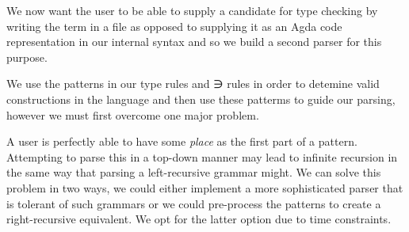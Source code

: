{\begin{code}
\AgdaSymbol{)}\<%
\\
\>[0]\AgdaSpace{}%
\AgdaSpace{}%
\AgdaSpace{}%
\AgdaSpace{}%
\AgdaSymbol{(}\AgdaSymbol{;}\AgdaSpace{}%
\AgdaSymbol{;}\AgdaSpace{}%
\AgdaSymbol{)}\<%
\\
\>[0]\AgdaSpace{}%
\AgdaSpace{}%
\AgdaSpace{}%
\AgdaSymbol{(}\AgdaSpace{}%
\AgdaSpace{}%
\AgdaSymbol{)}\<%
\\
\>[0]\AgdaSpace{}%
\AgdaSpace{}%
\AgdaSpace{}%
\AgdaSymbol{(}\AgdaSpace{}%
\AgdaSpace{}%
\AgdaSymbol{)}\<%
\\
\>[0]\AgdaSpace{}%
\AgdaSpace{}%
\AgdaSpace{}%
\AgdaSymbol{(}\AgdaSymbol{)}\<%
\\
\>[0]\AgdaSpace{}%
\AgdaSpace{}%
\AgdaSpace{}%
\AgdaSpace{}%
\AgdaSymbol{(}\AgdaSymbol{;}\AgdaSpace{}%
\AgdaSymbol{)}\<%
\end{code}
}
We now want the user to be able to supply a candidate for type checking by
writing the term in a file as opposed to supplying it as an Agda code
representation in our internal syntax and so we build a second parser for this
purpose.

We use the patterns in our type rules and ∋ rules in order to detemine valid
constructions in the language and then use these patterms to guide our parsing,
however we must first overcome one major problem.

A user is perfectly able to have some \emph{place} as the first part of a pattern.
Attempting to parse this in a top-down manner may lead to infinite recursion in
the same way that parsing a left-recursive grammar might. We can solve this problem
in two ways, we could either implement a more sophisticated parser that is tolerant
of such grammars or we could pre-process the patterns to create a right-recursive
equivalent. We opt for the latter option due to time constraints.

